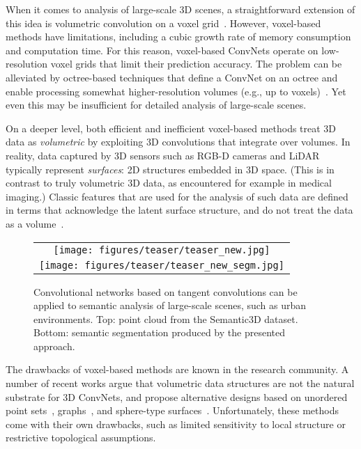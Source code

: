 \documentclass[10pt,twocolumn,letterpaper]{article}
\begin{document}
When it comes to analysis of large-scale 3D scenes, a straightforward extension of this idea is volumetric convolution on a voxel grid~\cite{maturana15,wu15,dai17}. However, voxel-based methods have limitations, including a cubic growth rate of memory consumption and computation time.
For this reason, voxel-based ConvNets operate on low-resolution voxel grids that limit their prediction accuracy.
The problem can be alleviated by octree-based techniques that define a ConvNet on an octree and enable processing somewhat higher-resolution volumes (e.g., up to  voxels)~\cite{riegler17,wang17,Hane2017,Riegler2017:3DV,Tatarchenko2017}.
Yet even this may be insufficient for detailed analysis of large-scale scenes.

On a deeper level, both efficient and inefficient voxel-based methods treat 3D data as \emph{volumetric} by exploiting 3D convolutions that integrate over volumes. In reality, data captured by 3D sensors such as RGB-D cameras and LiDAR typically represent \emph{surfaces}: 2D structures embedded in 3D space. (This is in contrast to truly volumetric 3D data, as encountered for example in medical imaging.) Classic features that are used for the analysis of such data are defined in terms that acknowledge the latent surface structure, and do not treat the data as a volume~\cite{JohnsonHebert1999,Frome2004,Rusu2009}.


\begin{figure}
\centering
\begin{tabular}{@{}c@{}}
\texttt{[image: figures/teaser/teaser\_new.jpg]} \\
\texttt{[image: figures/teaser/teaser\_new\_segm.jpg]}
\end{tabular}
\caption{Convolutional networks based on tangent convolutions can be applied to semantic analysis of large-scale scenes, such as urban environments. Top: point cloud from the Semantic3D dataset. Bottom: semantic segmentation produced by the presented approach.}
\label{fig:teaser}
\end{figure}

The drawbacks of voxel-based methods are known in the research community.
A number of recent works argue that volumetric data structures are not the natural substrate for 3D ConvNets, and propose alternative designs based on unordered point sets~\cite{qi17}, graphs~\cite{simonovsky17}, and sphere-type surfaces~\cite{maron17}. Unfortunately, these methods come with their own drawbacks, such as limited sensitivity to local structure or restrictive topological assumptions.
\end{document}
